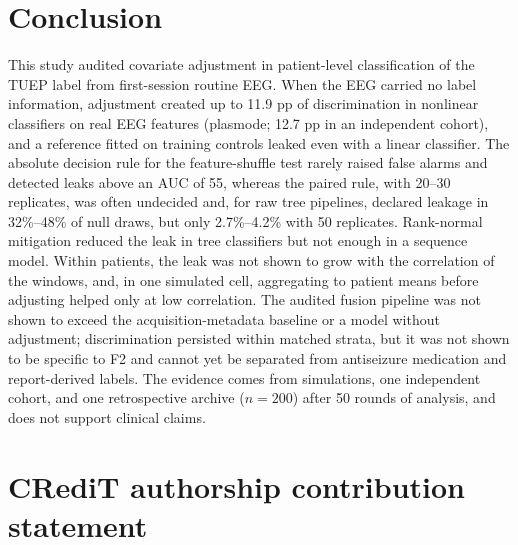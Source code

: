 \section{Conclusion}\label{sec:conclusion}
This study audited covariate adjustment in patient-level classification of the TUEP label from first-session routine EEG. When the EEG carried no label information, adjustment created up to 11.9 pp of discrimination in nonlinear classifiers on real EEG features (plasmode; 12.7 pp in an independent cohort), and a reference fitted on training controls leaked even with a linear classifier.
The absolute decision rule for the feature-shuffle test rarely raised false alarms and detected leaks above an AUC of 55, whereas the paired rule, with 20--30 replicates, was often undecided and, for raw tree pipelines, declared leakage in 32\%--48\% of null draws, but only 2.7\%--4.2\% with 50 replicates. Rank-normal mitigation reduced the leak in tree classifiers but not enough in a sequence model. Within patients, the leak was not shown to grow with the correlation of the windows, and, in one simulated cell, aggregating to patient means before adjusting helped only at low correlation.
The audited fusion pipeline was not shown to exceed the acquisition-metadata baseline or a model without adjustment; discrimination persisted within matched strata, but it was not shown to be specific to F2 and cannot yet be separated from antiseizure medication and report-derived labels.
The evidence comes from simulations, one independent cohort, and one retrospective archive ($n = 200$) after 50 rounds of analysis, and does not support clinical claims.

\section*{CRediT authorship contribution statement}
